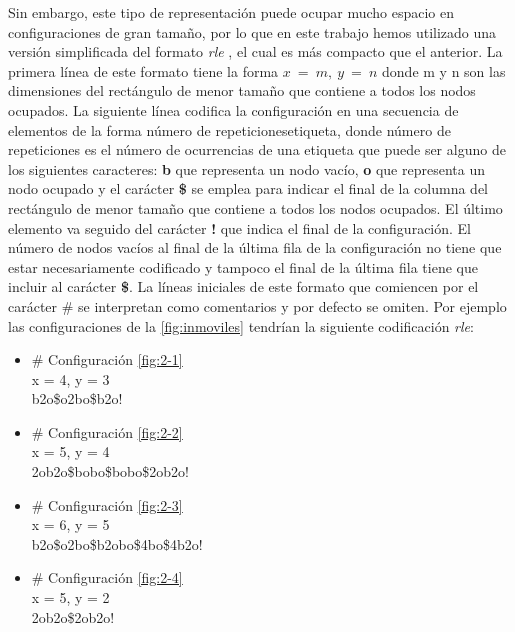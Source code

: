 \documentclass[../proyecto.tex]{memoir}
\begin{document}
Sin embargo, este tipo de representación puede ocupar mucho espacio en configuraciones de gran tamaño, por lo que en este trabajo hemos utilizado una versión simplificada del formato \textit{rle} \cite{rle}, el cual es más compacto que el anterior. La primera línea de este formato tiene la forma $x\ =\ m,\ y\ =\ n$ donde m y n son las dimensiones del rectángulo de menor tamaño que contiene a todos los nodos ocupados. La siguiente línea codifica la configuración en una secuencia de elementos de la forma {número de repeticiones}{etiqueta}, donde {número de repeticiones} es el número de ocurrencias de una {etiqueta} que puede ser alguno de los siguientes caracteres: \textbf{b} que representa un nodo vacío, \textbf{o} que representa un nodo ocupado y el carácter \textbf{\$} se emplea para indicar el final de la columna del rectángulo de menor tamaño que contiene a todos los nodos ocupados. El último elemento va seguido del carácter \textbf{!} que indica el final de la configuración. El número de nodos vacíos al final de la última fila de la configuración no tiene que estar necesariamente codificado y tampoco el final de la última fila tiene que incluir al carácter \textbf{\$}. La líneas iniciales de este formato que comiencen por el carácter \# se interpretan como comentarios y por defecto se omiten. Por ejemplo las configuraciones de la \autoref{fig:inmoviles} tendrían la siguiente codificación \textit{rle}:

\begin{itemize}
\item \# Configuración \autoref{fig:2-1} \\
x = 4, y = 3 \\
b2o\$o2bo\$b2o! \\

\item \# Configuración \autoref{fig:2-2} \\
x = 5, y = 4 \\
2ob2o\$bobo\$bobo\$2ob2o!

\item \# Configuración \autoref{fig:2-3} \\
x = 6, y = 5 \\
b2o\$o2bo\$b2obo\$4bo\$4b2o!

\item \# Configuración \autoref{fig:2-4} \\
x = 5, y = 2 \\
2ob2o\$2ob2o!

\end{itemize}
\end{document}

